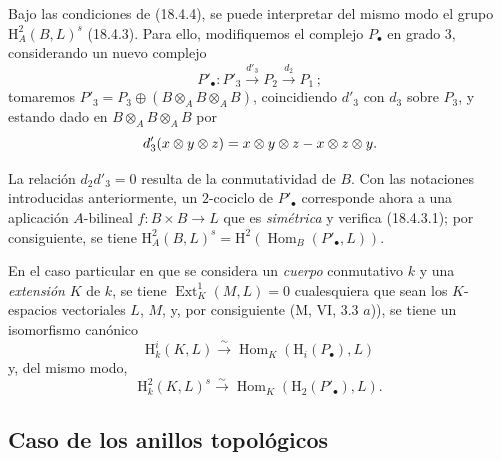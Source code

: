 \begin{env}[18.4.5]
\label{0.18.4.5-fr}
Bajo las condiciones de (18.4.4), se puede interpretar del mismo modo el
grupo $\mathrm H_A^2(B,L)^s$ (18.4.3). Para ello, modifiquemos el complejo
$P_\bullet$ en grado $3$, considerando un nuevo complejo
\[
  P'_\bullet:P'_3\xrightarrow{d'_3}P_2
  \xrightarrow{d_2}P_1\,;
\]
tomaremos
$P'_3=P_3\oplus(B\otimes_A B\otimes_A B)$, coincidiendo
$d'_3$ con $d_3$ sobre $P_3$, y estando dado en
$B\otimes_A B\otimes_A B$ por
\[
  d'_3(x\otimes y\otimes z)=x\otimes y\otimes z- x\otimes z\otimes y.
\]

La relación $d_2d'_3=0$ resulta de la conmutatividad de $B$. Con las notaciones
introducidas anteriormente, un $2$-cociclo de $P'_\bullet$ corresponde
ahora a una aplicación $A$-bilineal $f:B\times B\to L$ que es
\emph{simétrica} y verifica (18.4.3.1); por consiguiente, se tiene
$\mathrm H_A^2(B,L)^s=\mathrm H^2(\operatorname{Hom}_B(P'_\bullet,L))$.
\end{env}

\begin{env}[18.4.6]
\label{0.18.4.6-fr}
En el caso particular en que se considera un \emph{cuerpo} conmutativo $k$ y
una \emph{extensión} $K$ de $k$, se tiene
$\operatorname{Ext}_K^1(M,L)=0$ cualesquiera que sean los $K$-espacios
vectoriales $L$, $M$, y, por consiguiente (M, VI, 3.3 $a$)), se tiene un
isomorfismo canónico
\begin{equation}
\label{0.18.4.6.1-fr}
\tag{18.4.6.1}
  \mathrm H_k^i(K,L)\xrightarrow{\sim}
  \operatorname{Hom}_K(\mathrm H_i(P_\bullet),L)
\end{equation}
y, del mismo modo,
\begin{equation}
\label{0.18.4.6.2-fr}
\tag{18.4.6.2}
  \mathrm H_k^2(K,L)^s\xrightarrow{\sim}
  \operatorname{Hom}_K(\mathrm H_2(P'_\bullet),L).
\end{equation}
\end{env}

\subsection{Caso de los anillos topológicos}
\label{subsection:0.18.5-fr}

